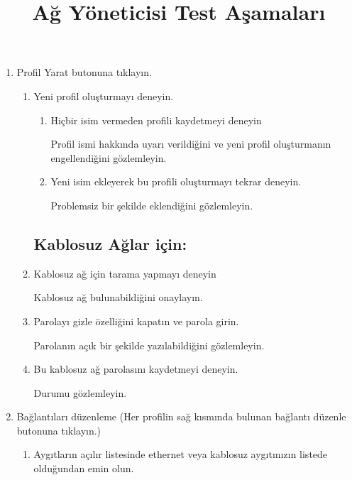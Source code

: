 \documentclass[a4paper,10pt]{article}
\title{Ağ Yöneticisi Test Aşamaları}
\begin{document}
\maketitle

\begin{enumerate}
  \item Profil Yarat butonuna tıklayın.
    \begin{enumerate}
     \subsection*{Ethernet veya Kablosuz ağlar için:}
	
      \item Yeni profil oluşturmayı deneyin.
	\begin{enumerate}
	  \item  Hiçbir isim vermeden profili kaydetmeyi deneyin

		Profil ismi hakkında uyarı verildiğini ve yeni profil oluşturmanın engellendiğini gözlemleyin.
	  \item Yeni isim ekleyerek bu profili oluşturmayı tekrar deneyin.

		Problemsiz bir şekilde eklendiğini gözlemleyin.
	\end{enumerate}
      
     \subsection*{Kablosuz Ağlar için:}
     \item Kablosuz ağ için tarama yapmayı deneyin
      
	Kablosuz ağ bulunabildiğini onaylayın.
     \item Parolayı gizle özelliğini kapatın ve parola girin.
        
	Parolanın açık bir şekilde yazılabildiğini gözlemleyin.
      \item Bu kablosuz ağ parolasını kaydetmeyi deneyin.
	
      	Durumu gözlemleyin.
     
     \end{enumerate}
     \item Bağlantıları düzenleme (Her profilin sağ kısmında bulunan bağlantı düzenle butonuna tıklayın.)
    
      \begin{enumerate}
      \item Aygıtların açılır listesinde ethernet veya kablosuz aygıtınızın listede olduğundan emin olun.


\end{enumerate}
\end{enumerate}
\end{document}
